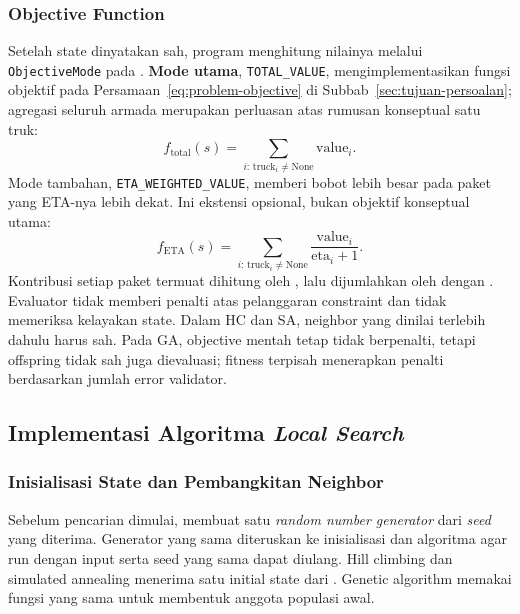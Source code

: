 \documentclass[12pt,a4paper]{article}
\begin{document}
\subsubsection{Objective Function}
Setelah state dinyatakan sah, program menghitung nilainya melalui \texttt{ObjectiveMode} pada . \textbf{Mode utama}, \texttt{TOTAL\_VALUE}, mengimplementasikan fungsi objektif pada Persamaan~\ref{eq:problem-objective} di Subbab~\ref{sec:tujuan-persoalan}; agregasi seluruh armada merupakan perluasan atas rumusan konseptual satu truk:
\begin{equation}
f_{\mathrm{total}}(s)=\sum_{i:\,\mathrm{truck}_i\ne\mathrm{None}}\mathrm{value}_i.
\label{eq:total-value}
\end{equation}
Mode tambahan, \texttt{ETA\_WEIGHTED\_VALUE}, memberi bobot lebih besar pada paket yang ETA-nya lebih dekat. Ini ekstensi opsional, bukan objektif konseptual utama:
\begin{equation}
f_{\mathrm{ETA}}(s)=\sum_{i:\,\mathrm{truck}_i\ne\mathrm{None}}
\frac{\mathrm{value}_i}{\mathrm{eta}_i+1}.
\label{eq:eta-value}
\end{equation}
Kontribusi setiap paket termuat dihitung oleh , lalu dijumlahkan oleh  dengan . Evaluator tidak memberi penalti atas pelanggaran constraint dan tidak memeriksa kelayakan state. Dalam HC dan SA, neighbor yang dinilai terlebih dahulu harus sah. Pada GA, objective mentah tetap tidak berpenalti, tetapi offspring tidak sah juga dievaluasi; fitness terpisah menerapkan penalti berdasarkan jumlah error validator.

\subsection{Implementasi Algoritma \textit{Local Search}}
\subsubsection{Inisialisasi State dan Pembangkitan Neighbor}
Sebelum pencarian dimulai,  membuat satu \textit{random number generator} dari \textit{seed} yang diterima. Generator yang sama diteruskan ke inisialisasi dan algoritma agar run dengan input serta seed yang sama dapat diulang. Hill climbing dan simulated annealing menerima satu initial state dari . Genetic algorithm memakai fungsi yang sama untuk membentuk anggota populasi awal.
\end{document}
